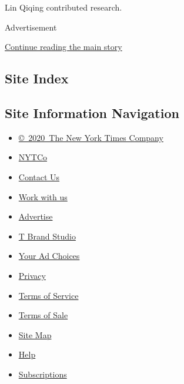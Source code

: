 Lin Qiqing contributed research.

Advertisement

\protect\hyperlink{after-bottom}{Continue reading the main story}

\hypertarget{site-index}{%
\subsection{Site Index}\label{site-index}}

\hypertarget{site-information-navigation}{%
\subsection{Site Information
Navigation}\label{site-information-navigation}}

\begin{itemize}
\tightlist
\item
  \href{https://help.nytimes.com/hc/en-us/articles/115014792127-Copyright-notice}{©~2020~The
  New York Times Company}
\end{itemize}

\begin{itemize}
\tightlist
\item
  \href{https://www.nytco.com/}{NYTCo}
\item
  \href{https://help.nytimes.com/hc/en-us/articles/115015385887-Contact-Us}{Contact
  Us}
\item
  \href{https://www.nytco.com/careers/}{Work with us}
\item
  \href{https://nytmediakit.com/}{Advertise}
\item
  \href{http://www.tbrandstudio.com/}{T Brand Studio}
\item
  \href{https://www.nytimes.com/privacy/cookie-policy\#how-do-i-manage-trackers}{Your
  Ad Choices}
\item
  \href{https://www.nytimes.com/privacy}{Privacy}
\item
  \href{https://help.nytimes.com/hc/en-us/articles/115014893428-Terms-of-service}{Terms
  of Service}
\item
  \href{https://help.nytimes.com/hc/en-us/articles/115014893968-Terms-of-sale}{Terms
  of Sale}
\item
  \href{https://spiderbites.nytimes.com}{Site Map}
\item
  \href{https://help.nytimes.com/hc/en-us}{Help}
\item
  \href{https://www.nytimes.com/subscription?campaignId=37WXW}{Subscriptions}
\end{itemize}
